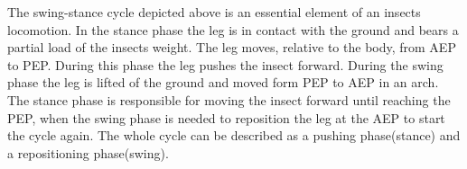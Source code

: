 The swing-stance cycle depicted above is an essential element of an insects locomotion.
In the stance phase the leg is in contact with the ground and bears a partial load of the insects weight.
The leg moves, relative to the body, from AEP to PEP. During this phase the leg pushes the insect forward.
During the swing phase the leg is lifted of the ground and moved form PEP to AEP in an arch.
The stance phase is responsible for moving the insect forward until reaching the PEP, when the swing phase is needed to reposition the leg at the AEP to start the cycle again.
The whole cycle can be described as a pushing phase(stance) and a repositioning phase(swing).

